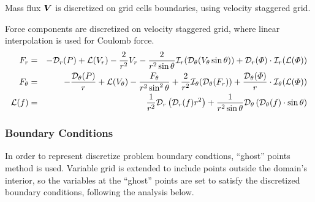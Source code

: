 Mass flux $\boldsymbol{V}$ is discretized on grid cells boundaries, 
using velocity staggered grid.

Force components are discretized on velocity staggered grid, where
linear interpolation is used for Coulomb force.
\begin{eqnarray}
F_r &=& -\mathcal{D}_r(P) 
          + \mathcal{L}(V_r) - \frac{2}{r^2} V_r 
		  - \frac{2}{r^2 \sin\theta} \mathcal{I}_r(\mathcal{D}_\theta (V_\theta \sin\theta))
          + \mathcal{D}_r(\varPhi) \cdot \mathcal{I}_r(\mathcal{L}(\varPhi)) \\
F_\theta &=& -\frac{\mathcal{D}_\theta(P)}{r} 
		  + \mathcal{L}(V_\theta) - \frac{F_\theta}{r^2 \sin^2\theta} 
		  + \frac{2}{r^2} \mathcal{I}_\theta(\mathcal{D}_\theta(F_r))
		  + \frac{\mathcal{D}_\theta(\varPhi)}{r} \cdot \mathcal{I}_\theta(\mathcal{L}(\varPhi)) \\
\mathcal{L}(f) &=& \frac{1}{r^2}\mathcal{D}_r\left(\mathcal{D}_r(f) r^2\right) + 
\frac{1}{r^2 \sin\theta} \mathcal{D}_\theta\left(\mathcal{D}_\theta(f) \cdot \sin\theta\right)
\end{eqnarray}


\subsubsection{Boundary Conditions}
In order to represent discretize problem boundary condtions, 
``ghost'' points method is used. 
Variable grid is extended to include points outside the domain's interior,
so the variables at the ``ghost'' points are set to satisfy 
the discretized boundary conditions, following the analysis below.

